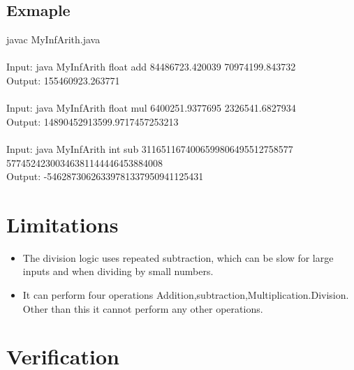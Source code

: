 \documentclass{article}
\begin{document}
    \subsection*{Exmaple}
    javac MyInfArith.java \\ \\
    Input: java MyInfArith float add 84486723.420039 70974199.843732
    \\ Output: 155460923.263771\\ \\
    
    Input: java MyInfArith float mul 6400251.9377695  2326541.6827934
    \\ Output: 14890452913599.9717457253213\\ \\

    Input: java MyInfArith int sub 3116511674006599806495512758577 \\57745242300346381144446453884008
    \\Output: -54628730626339781337950941125431

\section{Limitations}

    \begin{itemize}
        \item The division logic uses repeated subtraction, which can be slow for large inputs and when dividing by small numbers. \\
        \item It can perform four operations Addition,subtraction,Multiplication.Division.
        Other than this it cannot perform any other operations.\\
        
    \end{itemize}

\section{Verification}
\end{document}
